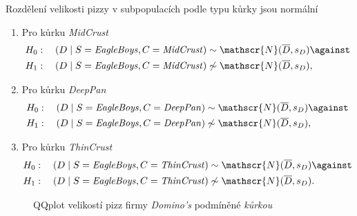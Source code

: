 \begin{hypothesis}
	\label{hyp:normalita_rozdeleni_velikosti_pizz_pro_firmu_eagle_boys_v_subpopulacich_podle_typu_kurky}
	Rozdělení velikosti pizzy v subpopulacích podle typu kůrky jsou normální
	\begin{enumerate}[label=(\alph*)]
		\item Pro kůrku \emph{MidCrust}
		      \label{hyp:normalita_rozdeleni_velikosti_pizz_pro_firmu_eagle_boys_v_subpopulacich_podle_typu_kurky_a}
		      \[
			      \begin{split}
				      &H_0: \quad (D \mid S = \text{\emph{EagleBoys}}, C = \text{\emph{MidCrust}}) \sim
				      \mathscr{N}(\overline{D}, s_D) \against \\
				      &H_1: \quad (D \mid S =
				      \text{\emph{EagleBoys}}, C = \text{\emph{MidCrust}}) \not\sim
				      \mathscr{N}(\overline{D}, s_D),
			      \end{split}
		      \]
		\item Pro kůrku \emph{DeepPan}
		      \label{hyp:normalita_rozdeleni_velikosti_pizz_pro_firmu_eagle_boys_v_subpopulacich_podle_typu_kurky_b}
		      \[
			      \begin{split}
				      &H_0: \quad (D \mid S = \text{\emph{EagleBoys}}, C = \text{\emph{DeepPan}}) \sim
				      \mathscr{N}(\overline{D}, s_D) \against \\
				      &H_1: \quad (D \mid S =
				      \text{\emph{EagleBoys}}, C = \text{\emph{DeepPan}}) \not\sim \mathscr{N}(\overline{D},
				      s_D),
			      \end{split}
		      \]
		\item Pro kůrku \emph{ThinCrust}
		      \label{hyp:normalita_rozdeleni_velikosti_pizz_pro_firmu_eagle_boys_v_subpopulacich_podle_typu_kurky_c}
		      \[
			      \begin{split}
				      &H_0: \quad (D \mid S = \text{\emph{EagleBoys}}, C = \text{\emph{ThinCrust}}) \sim
				      \mathscr{N}(\overline{D}, s_D) \against \\
				      &H_1: \quad (D \mid S =
				      \text{\emph{EagleBoys}}, C = \text{\emph{ThinCrust}}) \not\sim
				      \mathscr{N}(\overline{D}, s_D).
			      \end{split}
		      \]
	\end{enumerate}
\end{hypothesis}

\begin{figure}[H]
	\centering
	\label{fig:qqplots_crusts_dominos}
	
	\caption{QQplot velikostí pizz firmy \emph{Domino's} podmíněné \emph{kůrkou}}
\end{figure}

